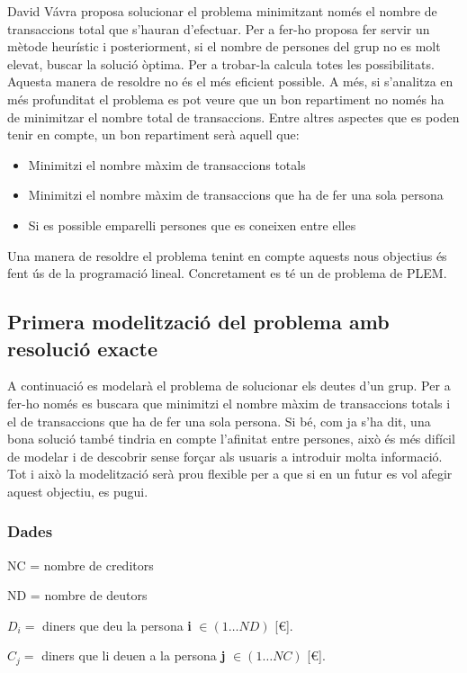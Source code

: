 David Vávra proposa solucionar el problema minimitzant només el nombre de transaccions total que s'hauran d'efectuar. Per a fer-ho proposa fer servir un mètode heurístic i posteriorment, si el nombre de persones del grup no es molt elevat, buscar la solució òptima. Per a trobar-la calcula totes les possibilitats. Aquesta manera de resoldre no és el més eficient possible. A més, si s'analitza en més profunditat el problema es pot veure que un bon repartiment no només ha de minimitzar el nombre total de transaccions. Entre altres aspectes que es poden tenir en compte, un bon repartiment serà aquell que:

\begin{itemize}
\item Minimitzi el nombre màxim de transaccions totals
\item Minimitzi el nombre màxim de transaccions que ha de fer una sola persona
\item Si es possible emparelli persones que es coneixen entre elles
\end{itemize}

Una manera de resoldre el problema tenint en compte aquests nous objectius és fent ús de la programació lineal. Concretament es té un de problema de \ac{PLEM}.

\subsection{Primera modelització del problema amb resolució exacte}
A continuació es modelarà el problema de solucionar els deutes d'un grup. Per a fer-ho només es buscara que minimitzi el nombre màxim de transaccions totals i el de transaccions que ha de fer una sola persona. Si bé, com ja s'ha dit, una bona solució també tindria en compte l'afinitat entre persones, això és més difícil de modelar i de descobrir sense forçar als usuaris a introduir molta informació. Tot i això la modelització serà prou flexible per a que si en un futur es vol afegir aquest objectiu, es pugui. 
\subsubsection{Dades}
\begin{description}
\item NC = nombre de creditors
\item ND = nombre de deutors
\item $D_{i}=$ diners que deu la persona \textbf{i} $\in (1 \ldots ND)$  [€].
\item $C_{j}=$ diners que li deuen a la persona \textbf{j} $\in (1 \ldots NC)$  [€].
\end{description}


